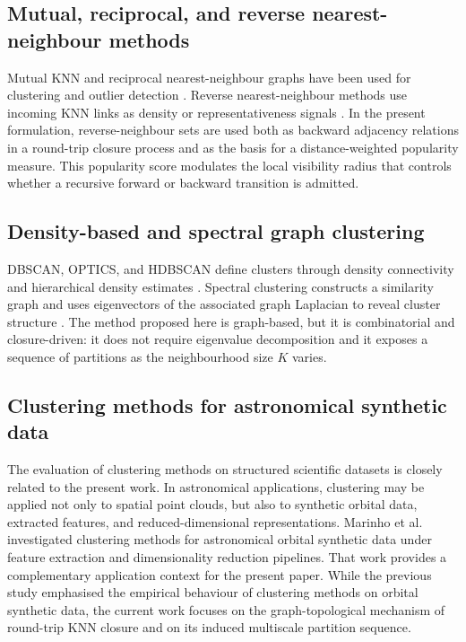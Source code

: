\documentclass[pdflatex,sn-mathphys-num]{sn-jnl}
\begin{document}
\subsection{Mutual, reciprocal, and reverse nearest-neighbour methods}

Mutual KNN and reciprocal nearest-neighbour graphs have been used for clustering and outlier detection \citep{BritoChavezQuirozYukich1997,GowdaKrishna1978,SardanaBhatnagar2014}. Reverse nearest-neighbour methods use incoming KNN links as density or representativeness signals \citep{ChowdhuryAmorim2018}. In the present formulation, reverse-neighbour sets are used both as backward adjacency relations in a round-trip closure process and as the basis for a distance-weighted popularity measure. This popularity score modulates the local visibility radius that controls whether a recursive forward or backward transition is admitted.

\subsection{Density-based and spectral graph clustering}

DBSCAN, OPTICS, and HDBSCAN define clusters through density connectivity and hierarchical density estimates \citep{Ester1996DBSCAN,Ankerst1999OPTICS,Campello2013HDBSCAN,CampelloMoulaviZimekSander2015}. Spectral clustering constructs a similarity graph and uses eigenvectors of the associated graph Laplacian to reveal cluster structure \citep{NgJordanWeiss2002,VonLuxburg2007}. The method proposed here is graph-based, but it is combinatorial and closure-driven: it does not require eigenvalue decomposition and it exposes a sequence of partitions as the neighbourhood size $K$ varies.

\subsection{Clustering methods for astronomical synthetic data}

The evaluation of clustering methods on structured scientific datasets is closely related to the present work. In astronomical applications, clustering may be applied not only to spatial point clouds, but also to synthetic orbital data, extracted features, and reduced-dimensional representations. Marinho et al.~\citep{PereiraMarinho2026ClusteringAO} investigated clustering methods for astronomical orbital synthetic data under feature extraction and dimensionality reduction pipelines. That work provides a complementary application context for the present paper. While the previous study emphasised the empirical behaviour of clustering methods on orbital synthetic data, the current work focuses on the graph-topological mechanism of round-trip KNN closure and on its induced multiscale partition sequence.
\end{document}
